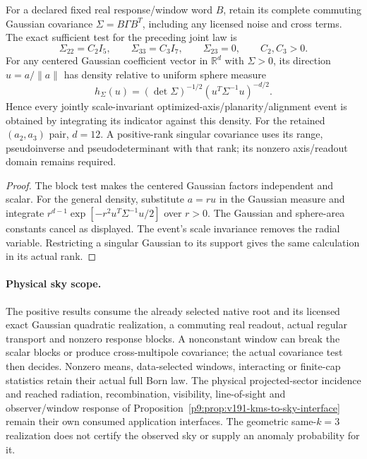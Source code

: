 \documentclass[12pt,a4paper]{article}
\begin{document}
\begin{proposition}
\label{p8:prop:v2189-sky-window-pushforward}
For a declared fixed real response/window word $B$, retain its complete
commuting Gaussian covariance $\Sigma=B\Gamma B^T$, including any
licensed noise and cross terms. The exact sufficient test for the preceding
joint law is
\[
 \Sigma_{22}=C_2I_5,\qquad\Sigma_{33}=C_3I_7,\qquad
 \Sigma_{23}=0,\qquad C_2,C_3>0.
\]
For any centered Gaussian coefficient vector in $\mathbb R^d$ with
$\Sigma>0$, its direction $u=a/\|a\|$ has density relative to uniform
sphere measure
\[
 \boxed{h_\Sigma(u)=(\det\Sigma)^{-1/2}
             (u^T\Sigma^{-1}u)^{-d/2}.}
\]
Hence every jointly scale-invariant optimized-axis/planarity/alignment
event is obtained by integrating its indicator against this density.
For the retained $(a_2,a_3)$ pair, $d=12$. A positive-rank singular
covariance uses its range, pseudoinverse and pseudodeterminant with
that rank; its nonzero axis/readout domain remains required.
\end{proposition}
\begin{proof}
The block test makes the centered Gaussian factors independent and scalar.
For the general density, substitute $a=ru$ in the Gaussian measure and
integrate $r^{d-1}\exp[-r^2u^T\Sigma^{-1}u/2]$ over $r>0$.
The Gaussian and sphere-area constants cancel as displayed. The event's
scale invariance removes the radial variable. Restricting a singular
Gaussian to its support gives the same calculation in its actual rank.
\end{proof}

\paragraph{Physical sky scope.}
The positive results consume the already selected native root and its
licensed exact Gaussian quadratic realization, a commuting real readout,
actual regular transport and nonzero response blocks. A nonconstant window
can break the scalar blocks or produce cross-multipole covariance; the
actual covariance test then decides. Nonzero means, data-selected windows,
interacting or finite-cap statistics retain their actual full Born law.
The physical projected-sector incidence and reached radiation,
recombination, visibility, line-of-sight and observer/window response of
Proposition~\ref{p9:prop:v191-kms-to-sky-interface} remain their own
consumed application interfaces. The geometric same-$k=3$ realization
does not certify the observed sky or supply an anomaly probability for it.
\end{document}
